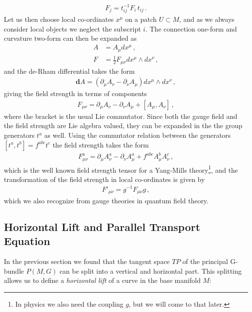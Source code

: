 \begin{align}
    F_{j}=t_{ij}^{-1}F_{i}\,t_{ij}\,.
\end{align}
Let us then choose local co-ordinates $x^{\mu}$ on a patch $U\subset M$, and as we always consider local objects we neglect the subscript $i$. The connection one-form and curvature two-form can then be expanded as
\begin{align}
    A&=A_{\mu}dx^{\mu}\,,
    \\
    F&=\frac{1}{2}F_{\mu\nu}dx^{\mu}\wedge dx^{\nu}\,,
\end{align}
and the de-Rham differential takes the form
\begin{align}
    \textbf{d}A=(\partial_{\mu}A_{\nu}-\partial_{\nu}A_{\mu})dx^{\mu}\wedge dx^{\nu}\,,
\end{align}
giving the field strength in terms of components
\begin{align}\label{Field Strength}
    F_{\mu\nu}=\partial_{\mu}A_{\nu}-\partial_{\nu}A_{\mu}+[A_{\mu},A_{\nu}]\,,
\end{align}
where the bracket is the usual Lie commutator. Since both the gauge field and the field strength are Lie algebra valued, they can be expanded in the the group generators $t^{a}$ as well. Using the commutator relation between the generators $[t^{a},t^{b}]=f^{abc}t^{c}$ the field strength takes the form
\begin{align}\label{eq:curvature two-form}
    F_{\mu\nu}^{a}=\partial_{\mu}A_{\nu}^{a}-\partial_{\nu}A_{\mu}^{a}+f^{abc}A_{\mu}^{b}A_{\nu}^{c}\,,
\end{align}
which is the well known field strength tensor for a Yang-Mills theory\footnote{In physics we also need the coupling $g$, but we will come to that later.}, and the transformation of the field strength in local co-ordinates is given by
\begin{align}\label{eq:curvature two form transformation}
    F'_{\mu\nu}=g^{-1}F_{\mu\nu}g\,,
\end{align}
which we also recognize from gauge theories in quantum field theory.

\subsection*{Horizontal Lift and Parallel Transport Equation}
In the previous section we found that the tangent space $TP$ of the principal G-bundle $P(M,G)$ can be split into a vertical and horizontal part. This splitting allows us to define a \emph{horizontal lift} of a curve in the base manifold $M$:

